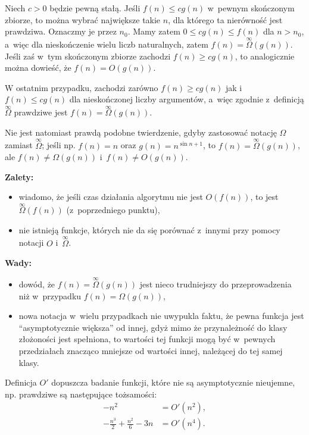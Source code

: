 
\subexercise{} %
Niech $c>0$ będzie pewną stałą. Jeśli $f(n)\le cg(n)$ w~pewnym skończonym zbiorze, to można wybrać największe takie $n$, dla którego ta nierówność jest prawdziwa. Oznaczmy je przez $n_0$. Mamy zatem $0\le cg(n)\le f(n)$ dla $n>n_0$, a~więc dla nieskończenie wielu liczb naturalnych, zatem $f(n)=\overset{\infty}{\Omega}(g(n))$. Jeśli zaś w~tym skończonym zbiorze zachodzi $f(n)\ge cg(n)$, to analogicznie można dowieść, że $f(n)=O(g(n))$.

W ostatnim przypadku, zachodzi zarówno $f(n)\ge cg(n)$ jak i~$f(n)\le cg(n)$ dla nieskończonej liczby argumentów, a~więc zgodnie z~definicją $\overset{\infty}{\Omega}$ prawdziwe jest $f(n)=\overset{\infty}{\Omega}(g(n))$.

Nie jest natomiast prawdą podobne twierdzenie, gdyby zastosować notację $\Omega$ zamiast $\overset{\infty}{\Omega}$; jeśli np. $f(n)=n$ oraz $g(n)=n^{\sin n+1}$, to $f(n)=\overset{\infty}{\Omega}(g(n))$, ale $f(n)\ne\Omega(g(n))$ i~$f(n)\ne O(g(n))$.

\subexercise{} %
\textbf{Zalety:}
\begin{itemize}
	\item wiadomo, że jeśli czas działania algorytmu nie jest $O(f(n))$, to jest $\overset{\infty}{\Omega}(f(n))$ (z~poprzedniego punktu),
	\item nie istnieją funkcje, których nie da się porównać z~innymi przy pomocy notacji $O$ i~$\overset{\infty}{\Omega}$.
\end{itemize}
\textbf{Wady:}
\begin{itemize}
	\item dowód, że $f(n)=\overset{\infty}{\Omega}(g(n))$ jest nieco trudniejszy do przeprowadzenia niż w~przypadku $f(n)=\Omega(g(n))$,
	\item nowa notacja w~wielu przypadkach nie uwypukla faktu, że pewna funkcja jest ``asymptotycznie większa'' od innej, gdyż mimo że przynależność do klasy złożoności jest spełniona, to wartości tej funkcji mogą być w~pewnych przedziałach znacząco mniejsze od wartości innej, należącej do tej samej klasy.
\end{itemize}

\subexercise{} %
Definicja $O'$ dopuszcza badanie funkcji, które nie są asymptotycznie nieujemne, np. prawdziwe są następujące tożsamości:
\begin{align*}
	-n^2 &= O'(n^2), \\
	-\frac{n^3}{2}+\frac{n^2}{6}-3n &= O'(n^4).
\end{align*}

